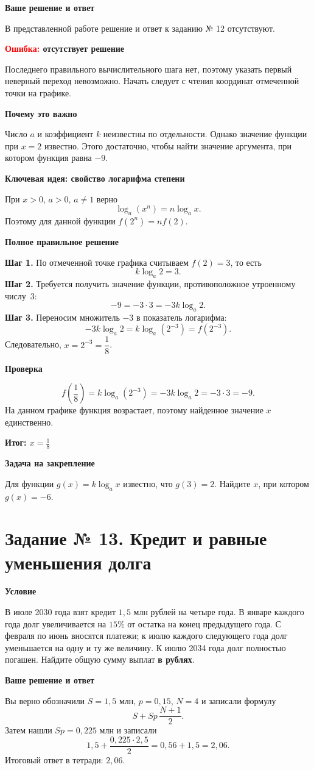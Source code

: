 \documentclass[a4paper,12pt]{article}
\newcommand{\headtxt}[1]{\par\smallskip\textbf{\textcolor{darkaccent}{#1}}\par\vspace{-1mm}}
\begin{document}
\headtxt{Ваше решение и ответ}
В представленной работе решение и ответ к заданию № 12 отсутствуют.

\headtxt{\textcolor{red}{Ошибка:} отсутствует решение}
Последнего правильного вычислительного шага нет, поэтому указать первый неверный переход невозможно. Начать следует с чтения координат отмеченной точки на графике.

\headtxt{Почему это важно}
Число $a$ и коэффициент $k$ неизвестны по отдельности. Однако значение функции при $x=2$ известно. Этого достаточно, чтобы найти значение аргумента, при котором функция равна $-9$.

\headtxt{\textcolor{blue!60!black}{Ключевая идея:} свойство логарифма степени}
При $x>0$, $a>0$, $a\ne1$ верно
\[
\log_a(x^n)=n\log_a x.
\]
Поэтому для данной функции $f(2^n)=n f(2)$.

\headtxt{Полное правильное решение}
\textbf{Шаг 1.} По отмеченной точке графика считываем $f(2)=3$, то есть
\[
k\log_a2=3.
\]
\textbf{Шаг 2.} Требуется получить значение функции, противоположное утроенному числу~3:
\[
-9=-3\cdot3=-3k\log_a2.
\]
\textbf{Шаг 3.} Переносим множитель $-3$ в показатель логарифма:
\[
-3k\log_a2=k\log_a(2^{-3})=f(2^{-3}).
\]
Следовательно, $x=2^{-3}=\dfrac18$.

\headtxt{Проверка}
\[
f\!\left(\frac18\right)=k\log_a(2^{-3})=-3k\log_a2=-3\cdot3=-9.
\]
На данном графике функция возрастает, поэтому найденное значение $x$ единственно.

\headtxt{\textcolor{teal!60!black}{Итог:} $\displaystyle x=\frac18$}
\headtxt{Задача на закрепление}
Для функции $g(x)=k\log_a x$ известно, что $g(3)=2$. Найдите $x$, при котором $g(x)=-6$.

\newpage
{}\label{task:13}
\section*{Задание № 13. Кредит и равные уменьшения долга}
\headtxt{Условие}
В июле 2030 года взят кредит $1{,}5$ млн рублей на четыре года. В январе каждого года долг увеличивается на $15\%$ от остатка на конец предыдущего года. С февраля по июнь вносятся платежи; к июлю каждого следующего года долг уменьшается на одну и ту же величину. К июлю 2034 года долг полностью погашен. Найдите общую сумму выплат \textbf{в рублях}.

\headtxt{Ваше решение и ответ}
Вы верно обозначили $S=1{,}5$ млн, $p=0{,}15$, $N=4$ и записали формулу
\[
S+Sp\,\frac{N+1}{2}.
\]
Затем нашли $Sp=0{,}225$ млн и записали
\[
1{,}5+\frac{0{,}225\cdot2{,}5}{2}=0{,}56+1{,}5=2{,}06.
\]
Итоговый ответ в тетради: $2{,}06$.
\end{document}
